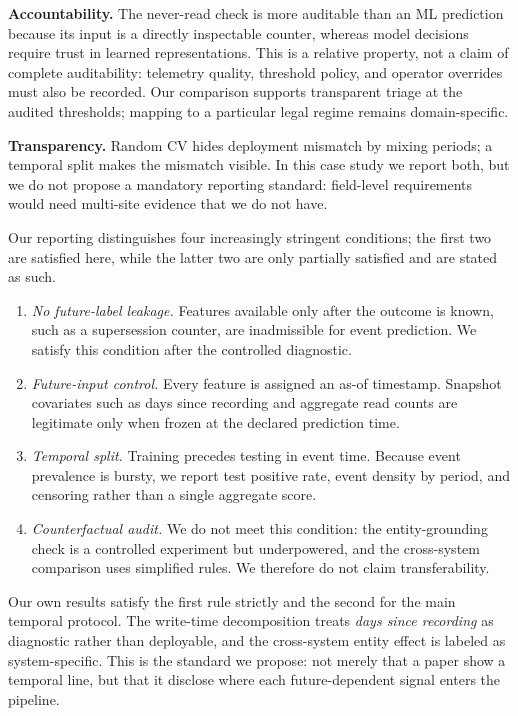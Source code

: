 \documentclass[sigconf,nonacm]{acmart}
\begin{document}
\textbf{Accountability.} The never-read check is more auditable than an ML prediction because its input is a directly inspectable counter, whereas model decisions require trust in learned representations. This is a relative property, not a claim of complete auditability: telemetry quality, threshold policy, and operator overrides must also be recorded. Our comparison supports transparent triage at the audited thresholds; mapping to a particular legal regime remains domain-specific.

\textbf{Transparency.} Random CV hides deployment mismatch by mixing periods; a temporal split makes the mismatch visible. In this case study we report both, but we do not propose a mandatory reporting standard: field-level requirements would need multi-site evidence that we do not have.

Our reporting distinguishes four increasingly stringent conditions; the first two are satisfied here, while the latter two are only partially satisfied and are stated as such.

\begin{enumerate}
\item \emph{No future-label leakage.} Features available only after the outcome is known, such as a supersession counter, are inadmissible for event prediction. We satisfy this condition after the controlled diagnostic.
\item \emph{Future-input control.} Every feature is assigned an as-of timestamp. Snapshot covariates such as days since recording and aggregate read counts are legitimate only when frozen at the declared prediction time.
\item \emph{Temporal split.} Training precedes testing in event time. Because event prevalence is bursty, we report test positive rate, event density by period, and censoring rather than a single aggregate score.
\item \emph{Counterfactual audit.} We do not meet this condition: the entity-grounding check is a controlled experiment but underpowered, and the cross-system comparison uses simplified rules. We therefore do not claim transferability.
\end{enumerate}

Our own results satisfy the first rule strictly and the second for the main temporal protocol. The write-time decomposition treats \emph{days since recording} as diagnostic rather than deployable, and the cross-system entity effect is labeled as system-specific. This is the standard we propose: not merely that a paper show a temporal line, but that it disclose where each future-dependent signal enters the pipeline.
\end{document}
